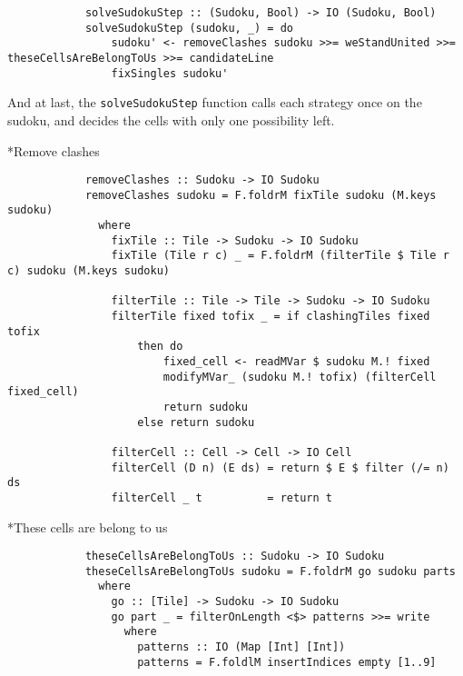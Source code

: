 \documentclass[a4paper,12pt]{article}
\begin{document}
\begin{section}
\begin{subsection}
\begin{subsubsection}
            \begin{lstlisting}
            solveSudokuStep :: (Sudoku, Bool) -> IO (Sudoku, Bool)
            solveSudokuStep (sudoku, _) = do
                sudoku' <- removeClashes sudoku >>= weStandUnited >>= theseCellsAreBelongToUs >>= candidateLine
                fixSingles sudoku'
            \end{lstlisting}

            And at last, the \texttt{solveSudokuStep} function calls each
            strategy once on the sudoku, and decides the cells with only one
            possibility left.

        \end{subsubsection}

        \begin{subsubsection}*{Remove clashes}

            \begin{lstlisting}
            removeClashes :: Sudoku -> IO Sudoku
            removeClashes sudoku = F.foldrM fixTile sudoku (M.keys sudoku)
              where
                fixTile :: Tile -> Sudoku -> IO Sudoku
                fixTile (Tile r c) _ = F.foldrM (filterTile $ Tile r c) sudoku (M.keys sudoku)

                filterTile :: Tile -> Tile -> Sudoku -> IO Sudoku
                filterTile fixed tofix _ = if clashingTiles fixed tofix
                    then do
                        fixed_cell <- readMVar $ sudoku M.! fixed
                        modifyMVar_ (sudoku M.! tofix) (filterCell fixed_cell)
                        return sudoku
                    else return sudoku

                filterCell :: Cell -> Cell -> IO Cell
                filterCell (D n) (E ds) = return $ E $ filter (/= n) ds
                filterCell _ t          = return t
            \end{lstlisting}

        \end{subsubsection}


        \begin{subsubsection}*{These cells are belong to us}

            \begin{lstlisting}
            theseCellsAreBelongToUs :: Sudoku -> IO Sudoku
            theseCellsAreBelongToUs sudoku = F.foldrM go sudoku parts
              where
                go :: [Tile] -> Sudoku -> IO Sudoku
                go part _ = filterOnLength <$> patterns >>= write
                  where
                    patterns :: IO (Map [Int] [Int])
                    patterns = F.foldlM insertIndices empty [1..9]


\end{lstlisting}
\end{subsubsection}
\end{subsection}
\end{section}
\end{document}
